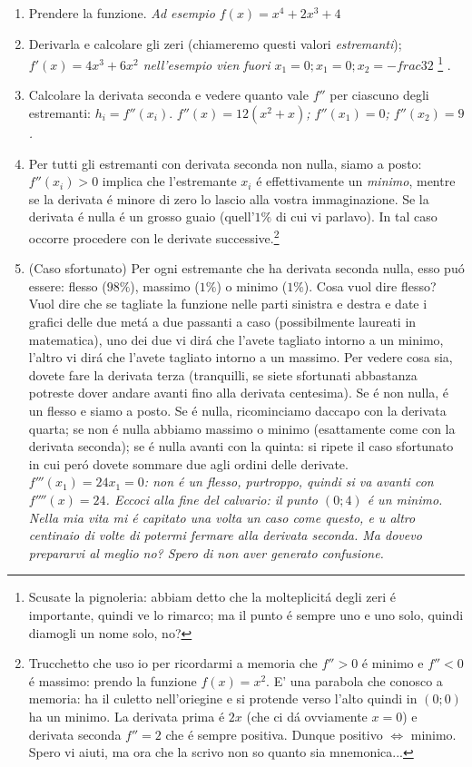 \begin{enumerate}
	\item Prendere la funzione. {\em Ad esempio $f(x)=x^4+2x^3+4$ }
	\item Derivarla e calcolare gli zeri (chiameremo questi valori {\em estremanti}); {\em $f'(x)=4x^3+6x^2$ nell'esempio vien fuori $x_1=0;x_1=0;x_2=-frac{3}{2}$}
		\footnote{Scusate la pignoleria: abbiam detto che la molteplicit\'a degli zeri \'e importante, quindi ve lo rimarco; ma il punto \'e sempre uno e uno solo,
		quindi diamogli un nome solo, no?}
		.
	\item Calcolare la derivata seconda e vedere quanto vale $f''$ per ciascuno degli estremanti: $h_i=f''(x_i)$. {\em $f''(x)=12(x^2+x)$; $f''(x_1)=0$; $f''(x_2)=9$.}
 	\item Per tutti gli estremanti con derivata seconda non nulla, siamo a posto: $f''(x_i)>0$ implica che l'estremante $x_i$ \'e effettivamente un {\em minimo}, mentre
	 	se la derivata \'e minore di zero lo lascio alla vostra immaginazione. Se la derivata \'e nulla \'e un grosso guaio (quell'$1\%$ di cui vi parlavo).
		In tal caso occorre procedere con le derivate successive.\footnote{Trucchetto che uso io per ricordarmi a memoria che $f''>0$ \'e minimo e $f''<0$ \'e massimo:
		prendo la funzione $f(x)=x^2$. E' una parabola che conosco a memoria: ha il culetto nell'oriegine e si protende verso l'alto quindi in $(0;0)$ ha un minimo.
		La derivata prima \'e $2x$ (che ci d\'a ovviamente $x=0$) e derivata seconda $f''=2$ che \'e sempre positiva. Dunque positivo $\Longleftrightarrow$ minimo.
		Spero vi aiuti, ma ora che la scrivo non so quanto sia mnemonica...}
	\item (Caso sfortunato) Per ogni estremante che ha derivata seconda nulla, esso pu\'o essere: flesso ($98\%$), massimo ($1\%$) o minimo ($1\%$). Cosa vuol dire flesso?
		Vuol dire che se tagliate la funzione nelle parti sinistra e destra e date i grafici delle due met\'a a due passanti a caso (possibilmente laureati in matematica),
		uno dei due vi dir\'a che l'avete tagliato intorno a un minimo, l'altro vi dir\'a che l'avete tagliato intorno a un massimo. Per vedere cosa sia, dovete fare la derivata
		terza (tranquilli, se siete sfortunati abbastanza potreste dover andare avanti fino alla derivata centesima). Se \'e non nulla, \'e un flesso e siamo a posto. Se \'e nulla,
		ricominciamo daccapo con la derivata quarta; se non \'e nulla abbiamo massimo o minimo (esattamente come con la derivata seconda); se \'e nulla avanti con la quinta:
		si ripete il caso sfortunato in cui per\'o dovete sommare due agli ordini delle derivate. {\em $f'''(x_1)=24x_1=0$: non \'e un flesso, purtroppo, quindi si va avanti
		con $f''''(x)=24$. Eccoci alla fine del calvario: il punto $(0;4)$ \'e un minimo. Nella mia vita mi \'e capitato una volta un caso come questo, e u altro centinaio
		di volte di potermi fermare alla derivata seconda. Ma dovevo prepararvi al meglio no? Spero di non aver generato confusione.}
\end{enumerate}

